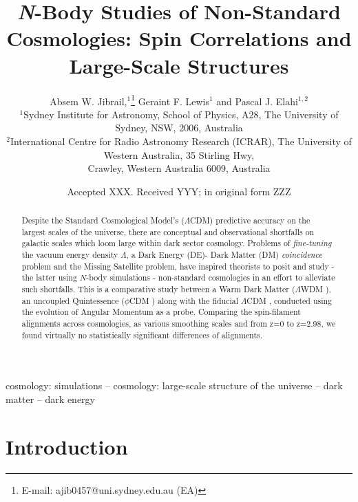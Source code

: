 \documentclass[a4paper,fleqn,usenatbib]{mnras}
\title[\textit{N}-Body Studies of Non-Standard Cosmologies]{ \textit{N}-Body Studies of Non-Standard Cosmologies: Spin Correlations and Large-Scale Structures }
\author[A. W. Jibrail et al.]{
Absem W. Jibrail,$^{1}$\thanks{E-mail: ajib0457@uni.sydney.edu.au (EA)}
Geraint F. Lewis$^{1}$
and Pascal J. Elahi$^{1,2}$
\\
$^{1}$Sydney Institute for Astronomy, School of Physics, A28, The University of Sydney, NSW, 2006, Australia\\
$^{2}$International Centre for Radio Astronomy Research (ICRAR), The University of Western Australia, 35 Stirling Hwy, \\
Crawley, Western Australia 6009, Australia}
\date{Accepted XXX. Received YYY; in original form ZZZ}
\def \lcdm{$\Lambda$CDM }
\def \lwdm{$\Lambda$WDM }
\def \qcdm{$\phi$CDM }
\begin{document}
\label{firstpage}
\pagerange{\pageref{firstpage}--\pageref{lastpage}}
\maketitle

\begin{abstract}
Despite the Standard Cosmological Model's ($\Lambda$CDM) predictive accuracy on the largest scales of the universe, there are conceptual and observational shortfalls on galactic scales which loom large within dark sector cosmology. Problems of \textit{fine-tuning} the vacuum energy density $\Lambda$, a Dark Energy (DE)- Dark Matter (DM) \textit{coincidence} problem and the Missing Satellite problem, have inspired theorists to posit and study - the latter using $N$-body simulations - non-standard cosmologies in an effort to alleviate such shortfalls. This is a comparative study between a Warm Dark Matter (\lwdm), an uncoupled Quintessence (\qcdm) along with the fiducial \lcdm, conducted using the evolution of Angular Momentum as a probe. Comparing the spin-filament alignments across cosmologies, as various smoothing scales and from z=0 to z=2.98, we found virtually no statistically significant differences of alignments.

\end{abstract}

\begin{keywords}
cosmology: simulations -- cosmology: large-scale structure of the universe -- dark matter -- dark energy
\end{keywords}



\section{Introduction}
\end{document}
